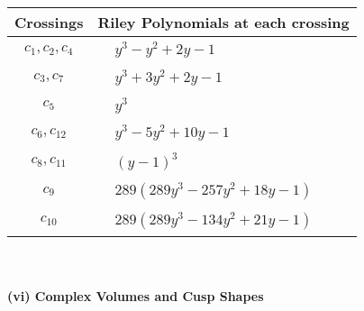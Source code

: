 \documentclass[1p]{elsarticle_modified}
\theoremstyle{definition}
\begin{document}
\begin{tabular}{m{50pt}|m{274pt}}
Crossings & \hspace{64pt}Riley Polynomials at each crossing \\
\hline $$\begin{aligned}c_{1},c_{2},c_{4}\end{aligned}$$&$\begin{aligned}
&y^3- y^2+2 y-1
\end{aligned}$\\
\hline $$\begin{aligned}c_{3},c_{7}\end{aligned}$$&$\begin{aligned}
&y^3+3 y^2+2 y-1
\end{aligned}$\\
\hline $$\begin{aligned}c_{5}\end{aligned}$$&$\begin{aligned}
&y^3
\end{aligned}$\\
\hline $$\begin{aligned}c_{6},c_{12}\end{aligned}$$&$\begin{aligned}
&y^3-5 y^2+10 y-1
\end{aligned}$\\
\hline $$\begin{aligned}c_{8},c_{11}\end{aligned}$$&$\begin{aligned}
&(y-1)^3
\end{aligned}$\\
\hline $$\begin{aligned}c_{9}\end{aligned}$$&$\begin{aligned}
&289(289 y^3-257 y^2+18 y-1)
\end{aligned}$\\
\hline $$\begin{aligned}c_{10}\end{aligned}$$&$\begin{aligned}
&289(289 y^3-134 y^2+21 y-1)
\end{aligned}$\\
\hline
\end{tabular}\\~\\
\newpage\flushleft \textbf{(vi) Complex Volumes and Cusp Shapes}
\end{document}
